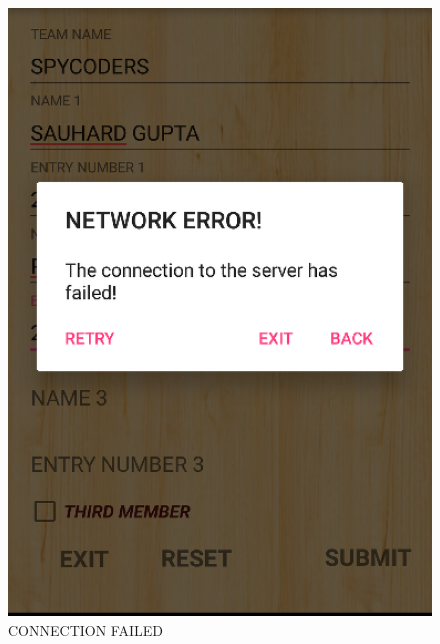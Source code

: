\documentclass[12pt]{article}
\begin{document}
\begin{itemize}
\begin{itemize}
\begin{figure}
	\includegraphics[scale=.7]{CONNECTION_FAILED.png}
	\caption{CONNECTION FAILED}
\end{figure}
\begin{figure}
	\centering

\end{figure}
\end{itemize}
\end{itemize}
\end{document}
